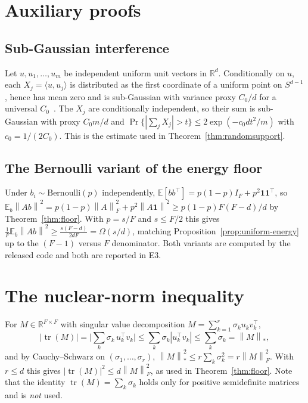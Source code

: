 \documentclass[preprint,12pt]{elsarticle}
\theoremstyle{definition}
\newcommand{\R}{\mathbb{R}}
\newcommand{\E}{\mathbb{E}}
\newcommand{\norm}[1]{\left\lVert #1 \right\rVert}
\newcommand{\nucnorm}[1]{\left\lVert #1 \right\rVert_*}
\begin{document}
\section{Auxiliary proofs}
\label{app:proofs}

\subsection{Sub-Gaussian interference}

Let $u,u_1,\dots,u_m$ be independent uniform unit vectors in $\R^d$. Conditionally on $u$, each
$X_j=\langle u,u_j\rangle$ is distributed as the first coordinate of a uniform point on
$S^{d-1}$, hence has mean zero and is sub-Gaussian with variance proxy $C_0/d$ for a universal
$C_0$~\cite[Thm.~3.4.6]{vershynin2018hdp}. The $X_j$ are conditionally independent, so their
sum is sub-Gaussian with proxy $C_0m/d$ and
$\Pr\{|\sum_j X_j|>t\}\le2\exp(-c_0dt^2/m)$ with $c_0=1/(2C_0)$. This is the estimate used in
Theorem~\ref{thm:randomsupport}.

\subsection{The Bernoulli variant of the energy floor}

Under $b_i\sim\mathrm{Bernoulli}(p)$ independently,
$\E[bb^{\top}]=p(1-p)I_F+p^2\mathbf 1\mathbf 1^{\top}$, so
$\E_b\norm{Ab}^2=p(1-p)\norm{A}_F^2+p^2\norm{A\mathbf 1}^2\ge p(1-p)F(F-d)/d$ by
Theorem~\ref{thm:floor}. With $p=s/F$ and $s\le F/2$ this gives
$\frac1F\E_b\norm{Ab}^2\ge\frac{s(F-d)}{2dF}=\Omega(s/d)$, matching
Proposition~\ref{prop:uniform-energy} up to the $(F-1)$ versus $F$ denominator. Both variants
are computed by the released code and both are reported in E3.

\section{The nuclear-norm inequality}
\label{app:nuclear}

For $M\in\R^{F\times F}$ with singular value decomposition
$M=\sum_{k=1}^{r}\sigma_k u_k v_k^{\top}$,
\[
  |\operatorname{tr}(M)|=\Big|\sum_k\sigma_k\,u_k^{\top}v_k\Big|
  \le\sum_k\sigma_k|u_k^{\top}v_k|\le\sum_k\sigma_k=\nucnorm{M},
\]
and by Cauchy--Schwarz on $(\sigma_1,\dots,\sigma_r)$,
$\nucnorm{M}^2\le r\sum_k\sigma_k^2=r\norm{M}_F^2$. With $r\le d$ this gives
$|\operatorname{tr}(M)|^2\le d\norm{M}_F^2$, as used in Theorem~\ref{thm:floor}. Note that the
identity $\operatorname{tr}(M)=\sum_k\sigma_k$ holds only for positive semidefinite matrices and
is \emph{not} used.
\end{document}

